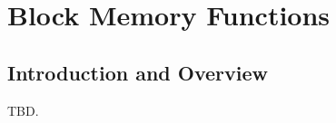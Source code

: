 \chapter{Block Memory Functions}
\label{cbmf0}

\section{Introduction and Overview}
\label{cbmf0:siov0}

TBD.

